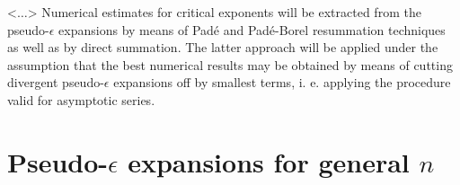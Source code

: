 \documentclass[preprint,preprintnumbers,amsmath,amssymb]{revtex4}
\newcommand{\comment}[1]{} %
\begin{document}
<$\dots$>
\comment{
In this paper, we study the critical behavior of two-dimensional $O(n)$-symmetric
systems within the frame of pseudo-$\epsilon$ expansion technique. The series for
the Wilson fixed point location $g*$ and critical exponents originating from the
five-loop RG expansions will be derived for arbitrary order parameter
dimensionality $n$. The pseudo-$\epsilon$ expansions obtained will be analysed in
detail for $n = 1$, $n = 0$ and $n = -1$, i. e. for the cases corresponding to
physically realizable systems with exactly known critical exponents \cite{N1982,
N1984, FQS1984}. These systems may be considered as testbeds for clarification of
the numerical effectiveness of various approximation schemes including RG
perturbation theory and the method of pseudo-$\epsilon$ expansion.} Numerical
estimates for critical exponents will be extracted from the pseudo-$\epsilon$
expansions by means of Pad\'e and Pad\'e-Borel resummation techniques as well as
by direct summation. The latter approach will be applied under the assumption
that the best numerical results may be obtained by means of cutting divergent
pseudo-$\epsilon$ expansions off by smallest terms, i. e. applying the procedure
valid for asymptotic series.

\section{Pseudo-$\epsilon$ expansions for general $n$}
\end{document}
